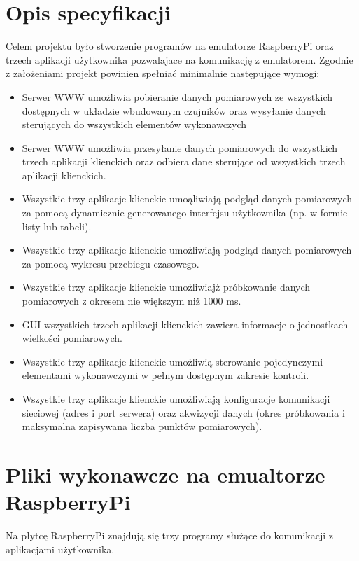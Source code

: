 \documentclass{article}
\begin{document}
	\section{Opis specyfikacji}
		Celem projektu było stworzenie programów na emulatorze RaspberryPi oraz trzech aplikacji użytkownika pozwalajace na komunikację z emulatorem.
		Zgodnie z założeniami projekt powinien spełniać minimalnie następujące wymogi:
		\begin{itemize}
			\item Serwer WWW umożliwia pobieranie danych pomiarowych ze wszystkich dostępnych w układzie
			wbudowanym czujników oraz wysyłanie danych sterujących do wszystkich elementów wykonawczych
			\item Serwer WWW umożliwia przesyłanie danych pomiarowych do wszystkich trzech aplikacji klienckich oraz odbiera dane sterujące od wszystkich trzech aplikacji klienckich.
			\item Wszystkie trzy aplikacje klienckie umoąliwiają podgląd danych pomiarowych za pomocą dynamicznie generowanego interfejsu użytkownika (np. w formie listy lub tabeli).
			\item Wszystkie trzy aplikacje klienckie umożliwiają podgląd danych pomiarowych za pomocą wykresu
			przebiegu czasowego.

			\item Wszystkie trzy aplikacje klienckie umożliwiajż próbkowanie danych pomiarowych z okresem nie
			większym niż 1000 ms.
			\item GUI wszystkich trzech aplikacji klienckich zawiera informacje o jednostkach wielkości pomiarowych.
			\item Wszystkie trzy aplikacje klienckie umożliwią sterowanie pojedynczymi elementami wykonawczymi
			w pełnym dostępnym zakresie kontroli.
			\item Wszystkie trzy aplikacje klienckie umożliwiają konfiguracje komunikacji sieciowej (adres i port
			serwera) oraz akwizycji danych (okres próbkowania i maksymalna zapisywana liczba punktów
			pomiarowych).

		\end{itemize}
	\section{Pliki wykonawcze na emualtorze RaspberryPi}
		Na płytcę RaspberryPi znajdują się trzy programy służące do komunikacji z aplikacjami użytkownika.
\end{document}
